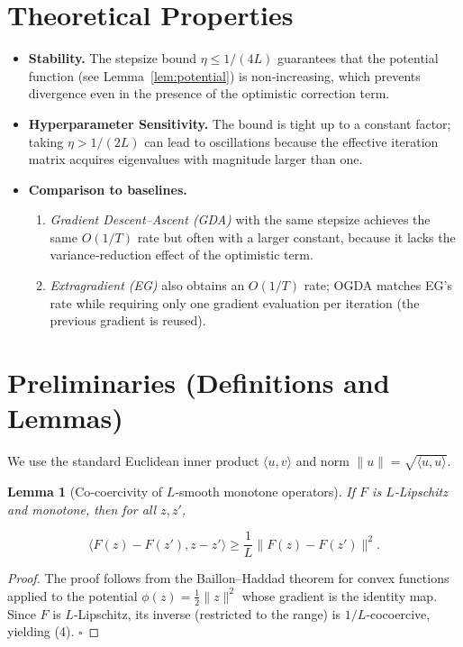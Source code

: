 \documentclass{article}
\newtheorem{lemma}{Lemma}
\begin{document}
\section{Theoretical Properties}
\begin{itemize}
    \item \textbf{Stability.} The stepsize bound \(\eta\le 1/(4L)\) guarantees that the potential function (see Lemma~\ref{lem:potential}) is non‑increasing, which prevents divergence even in the presence of the optimistic correction term.
    \item \textbf{Hyperparameter Sensitivity.} The bound is tight up to a constant factor; taking \(\eta>1/(2L)\) can lead to oscillations because the effective iteration matrix acquires eigenvalues with magnitude larger than one.
    \item \textbf{Comparison to baselines.}
    \begin{enumerate}[label=(\alph*)]
        \item \emph{Gradient Descent–Ascent (GDA)} with the same stepsize achieves the same \(O(1/T)\) rate but often with a larger constant, because it lacks the variance‑reduction effect of the optimistic term.
        \item \emph{Extragradient (EG)} also obtains an \(O(1/T)\) rate; OGDA matches EG’s rate while requiring only one gradient evaluation per iteration (the previous gradient is reused).
    \end{enumerate}
\end{itemize}

\section{Preliminaries (Definitions and Lemmas)}
We use the standard Euclidean inner product \(\langle u,v\rangle\) and norm \(\|u\|=\sqrt{\langle u,u\rangle}\).

\begin{lemma}[Co‑coercivity of $L$‑smooth monotone operators]\label{lem:coercive}
If \(F\) is $L$‑Lipschitz and monotone, then for all \(z,z'\),

\[
\langle F(z)-F(z'),z-z'\rangle\ge\frac{1}{L}\|F(z)-F(z')\|^{2}. \tag{4}
\]
\end{lemma}
\begin{proof}
The proof follows from the Baillon–Haddad theorem for convex functions applied to the potential \(\phi(z)=\frac12\|z\|^{2}\) whose gradient is the identity map. Since \(F\) is $L$‑Lipschitz, its inverse (restricted to the range) is \(1/L\)‑cocoercive, yielding (4). \hfill\(\square\)
\end{proof}
\end{document}
